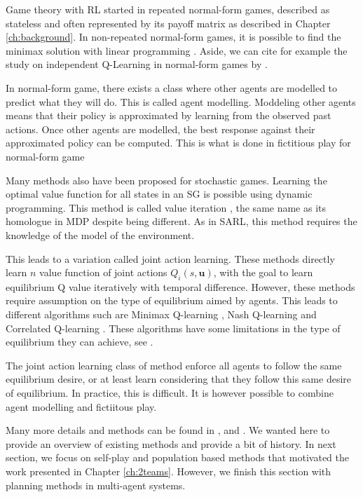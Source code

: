 Game theory with RL started in repeated normal-form games, described as stateless and often represented by its payoff matrix as described in Chapter \ref{ch:background}.
In non-repeated normal-form games, it is possible to find the minimax solution with linear programming \citep{marl-book}.
Aside, we can cite for example the study on independent Q-Learning in normal-form games by \cite{claus1998dynamics}.

In normal-form game, there exists a class where other agents are modelled to predict what they will do.
This is called agent modelling.
Moddeling other agents means that their policy is approximated by learning from the observed past actions.
Once other agents are modelled, the best response against their approximated policy can be computed.
This is what is done in fictitious play \citep{brown1951iterative} for normal-form game

Many methods also have been proposed for stochastic games.
Learning the optimal value function for all states in an SG is possible using dynamic programming.
This method is called value iteration \citep{stochasticGames}, the same name as its homologue in MDP \citep{sutton2018reinforcement} despite being different.
As in SARL, this method requires the knowledge of the model of the environment.

This leads to a variation called joint action learning.
These methods directly learn $n$ value function of joint actions $Q_i(s, \mathbf{u})$, with the goal to learn equilibrium Q value iteratively with temporal difference.
However, these methods require assumption on the type of equilibrium aimed by agents.
This leads to different algorithms such are Minimax Q-learning \citep{MarkovGames}, Nash Q-learning \citep{hu2003nash} and Correlated Q-learning \citep{greenwald2003correlated}.
These algorithms have some limitations in the type of equilibrium they can achieve, see \citep{marl-book}.

The joint action learning class of method enforce all agents to follow the same equilibrium desire, or at least learn considering that they follow this same desire of equilibrium.
In practice, this is difficult.
It is however possible to combine agent modelling and fictiitous play.

Many more details and methods can be found in \citep{marl-book}, \citep{Nowe2012GTMARL} and \citep{russel2010}.
We wanted here to provide an overview of existing methods and provide a bit of history.
In next section, we focus on self-play and population based methods that motivated the work presented in Chapter \ref{ch:2teams}.
However, we finish this section with planning methods in multi-agent systems.

